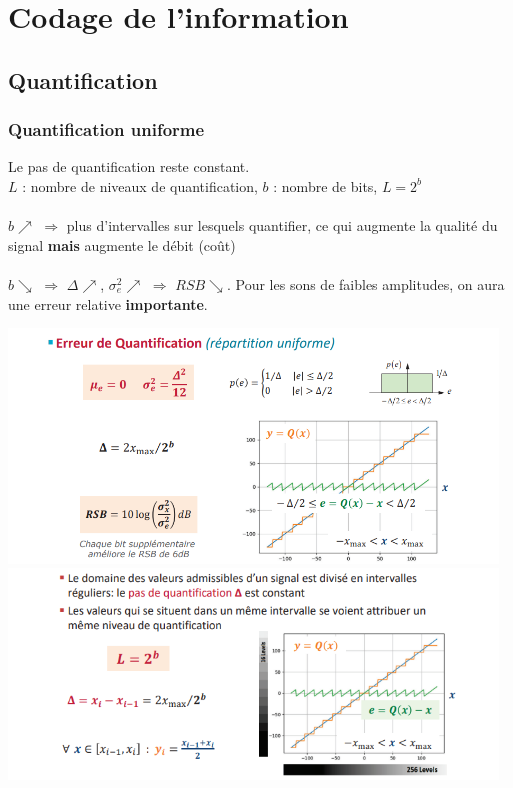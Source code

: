 \documentclass[a4paper,12pt,oneside]{report}	%
\begin{document}
\umonsCoverPage 

\tableofcontents
\newpage

\chapter{Codage de l'information}
    \section{Quantification}
        \subsection{Quantification uniforme}
            \colorbox{bright-blue}{Le pas de quantification reste constant.}\\
            $L$ : nombre de niveaux de quantification, $b$ : nombre de bits, $L = 2^b$\\\\
            $b\nearrow$ $\Rightarrow $ plus d'intervalles sur lesquels quantifier, ce qui augmente la qualité du signal \textbf{mais} augmente le débit \colorbox{bright-red}{(coût)}\\\\
            $b\searrow$ $\Rightarrow $ $\Delta \nearrow$, $\sigma_e ^2 \nearrow$ $\Rightarrow$ $RSB \searrow$. Pour les sons de faibles amplitudes, on aura une erreur relative \textbf{importante}. 
            \begin{center}
                \includegraphics[width=13cm]{LaTeX/pictures/1.1.1_2.png}
                \includegraphics[width=13cm]{LaTeX/pictures/1.1.1_1.png}
            \end{center}
            
\end{document}
